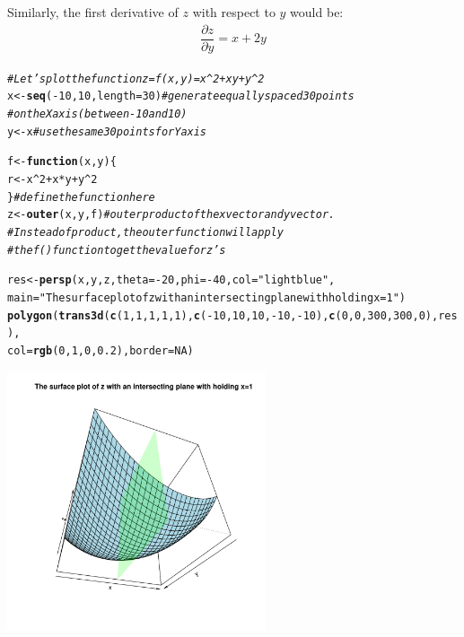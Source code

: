 \documentclass[conference,final,11pt,technote,onecolumn]{IEEEtran}\usepackage[]{graphicx}\usepackage[]{color}
\makeatletter
\newcommand{\hlnum}[1]{\textcolor[rgb]{0.686,0.059,0.569}{#1}}%
\newcommand{\hlstr}[1]{\textcolor[rgb]{0.192,0.494,0.8}{#1}}%
\newcommand{\hlcom}[1]{\textcolor[rgb]{0.678,0.584,0.686}{\textit{#1}}}%
\newcommand{\hlopt}[1]{\textcolor[rgb]{0,0,0}{#1}}%
\newcommand{\hlstd}[1]{\textcolor[rgb]{0.345,0.345,0.345}{#1}}%
\newcommand{\hlkwa}[1]{\textcolor[rgb]{0.161,0.373,0.58}{\textbf{#1}}}%
\newcommand{\hlkwb}[1]{\textcolor[rgb]{0.69,0.353,0.396}{#1}}%
\newcommand{\hlkwc}[1]{\textcolor[rgb]{0.333,0.667,0.333}{#1}}%
\newcommand{\hlkwd}[1]{\textcolor[rgb]{0.737,0.353,0.396}{\textbf{#1}}}%
\newenvironment{kframe}{%
 \def\at@end@of@kframe{}%
 \ifinner\ifhmode%
  \def\at@end@of@kframe{\end{minipage}}%
  \begin{minipage}{\columnwidth}%
 \fi\fi%
 \def\FrameCommand##1{\hskip\@totalleftmargin \hskip-\fboxsep
 \colorbox{shadecolor}{##1}\hskip-\fboxsep
     \hskip-\linewidth \hskip-\@totalleftmargin \hskip\columnwidth}%
 \MakeFramed {\advance\hsize-\width
   \@totalleftmargin\z@ \linewidth\hsize
   \@setminipage}}%
 {\par\unskip\endMakeFramed%
 \at@end@of@kframe}
\newenvironment{knitrout}{}{} %
\makeatother
\begin{document}
Similarly, the first derivative of $z$ with respect to $y$ would be:
\begin{eqnarray}
\nonumber \dfrac{\partial z}{\partial y} = x+2y
\end{eqnarray}
\begin{knitrout}
\color{fgcolor}\begin{kframe}
\begin{alltt}
\hlcom{#Let's plot the function z = f(x,y) = x^2 + xy + y^2}
\hlstd{x} \hlkwb{<-} \hlkwd{seq}\hlstd{(}\hlopt{-}\hlnum{10}\hlstd{,}\hlnum{10}\hlstd{,}\hlkwc{length}\hlstd{=}\hlnum{30}\hlstd{)} \hlcom{#generate equally spaced 30 points }
                \hlcom{#on the X axis (between -10 and 10)}
\hlstd{y} \hlkwb{<-} \hlstd{x} \hlcom{#use the same 30 points for Y axis}

\hlstd{f} \hlkwb{<-} \hlkwa{function}\hlstd{(}\hlkwc{x}\hlstd{,}\hlkwc{y}\hlstd{)\{}
        \hlstd{r} \hlkwb{<-} \hlstd{x}\hlopt{^}\hlnum{2}\hlopt{+}\hlstd{x}\hlopt{*}\hlstd{y}\hlopt{+}\hlstd{y}\hlopt{^}\hlnum{2}
\hlstd{\}} \hlcom{#define the function here}
\hlstd{z} \hlkwb{<-} \hlkwd{outer}\hlstd{(x,y,f)} \hlcom{#outer product of the x vector and y vector. }
                \hlcom{#Instead of product, the outer function will apply }
                \hlcom{#the f() function to get the value for z's}

\hlstd{res} \hlkwb{<-} \hlkwd{persp}\hlstd{(x,y,z,}\hlkwc{theta}\hlstd{=}\hlopt{-}\hlnum{20}\hlstd{,}\hlkwc{phi}\hlstd{=}\hlopt{-}\hlnum{40}\hlstd{,}\hlkwc{col}\hlstd{=}\hlstr{"lightblue"}\hlstd{,}
        \hlkwc{main}\hlstd{=}\hlstr{"The surface plot of z with an intersecting plane with holding x=1"}\hlstd{)}
\hlkwd{polygon}\hlstd{(}\hlkwd{trans3d}\hlstd{(}\hlkwd{c}\hlstd{(}\hlnum{1}\hlstd{,}\hlnum{1}\hlstd{,}\hlnum{1}\hlstd{,}\hlnum{1}\hlstd{,}\hlnum{1}\hlstd{),} \hlkwd{c}\hlstd{(}\hlopt{-}\hlnum{10}\hlstd{,}\hlnum{10}\hlstd{,}\hlnum{10}\hlstd{,}\hlopt{-}\hlnum{10}\hlstd{,}\hlopt{-}\hlnum{10}\hlstd{),}\hlkwd{c}\hlstd{(}\hlnum{0}\hlstd{,}\hlnum{0}\hlstd{,}\hlnum{300}\hlstd{,}\hlnum{300}\hlstd{,}\hlnum{0}\hlstd{),res),}
                        \hlkwc{col}\hlstd{=}\hlkwd{rgb}\hlstd{(}\hlnum{0}\hlstd{,}\hlnum{1}\hlstd{,}\hlnum{0}\hlstd{,}\hlnum{0.2}\hlstd{),}\hlkwc{border}\hlstd{=}\hlnum{NA}\hlstd{)}
\end{alltt}
\end{kframe}

{\centering \includegraphics[width=3in]{figure/minimal-Plot-surface-3-1} 

}
\end{knitrout}
\end{document}

